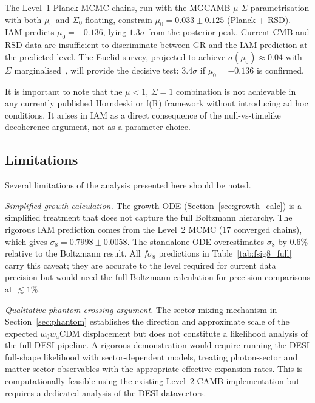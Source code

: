 \documentclass[12pt,a4paper]{article}
\begin{document}
The Level~1 Planck MCMC chains, run with the MGCAMB $\mu$-$\Sigma$
parametrisation with both $\mu_0$ and $\Sigma_0$ floating, constrain
$\mu_0 = 0.033 \pm 0.125$ (Planck + RSD).
IAM predicts $\mu_0 = -0.136$, lying $1.3\sigma$ from the posterior peak.
Current CMB and RSD data are insufficient to discriminate between GR and
the IAM prediction at the predicted level.
The Euclid survey, projected to achieve $\sigma(\mu_0) \approx 0.04$ with
$\Sigma$ marginalised~\citep{Euclid2020forecast}, will provide the
decisive test: $3.4\sigma$ if $\mu_0 = -0.136$ is confirmed.

It is important to note that the $\mu < 1$, $\Sigma = 1$ combination is
not achievable in any currently published Horndeski or f(R) framework
without introducing ad hoc conditions.
It arises in IAM as a direct consequence of the null-vs-timelike
decoherence argument, not as a parameter choice.

\subsection{Limitations}
\label{sec:limits}

Several limitations of the analysis presented here should be noted.

\textit{Simplified growth calculation.}
The growth ODE (Section~\ref{sec:growth_calc}) is a simplified treatment
that does not capture the full Boltzmann hierarchy.
The rigorous IAM prediction comes from the Level~2 MCMC (17 converged
chains), which gives $\sigma_8 = 0.7998 \pm 0.0058$.
The standalone ODE overestimates $\sigma_8$ by $0.6\%$ relative to the
Boltzmann result.
All $f\sigma_8$ predictions in Table~\ref{tab:fsig8_full} carry this
caveat; they are accurate to the level required for current data precision
but would need the full Boltzmann calculation for precision comparisons
at $\lesssim 1\%$.

\textit{Qualitative phantom crossing argument.}
The sector-mixing mechanism in Section~\ref{sec:phantom} establishes
the direction and approximate scale of the expected $w_0 w_a$CDM
displacement but does not constitute a likelihood analysis of the full
DESI pipeline.
A rigorous demonstration would require running the DESI full-shape
likelihood with sector-dependent models, treating photon-sector and
matter-sector observables with the appropriate effective expansion rates.
This is computationally feasible using the existing Level~2 CAMB
implementation but requires a dedicated analysis of the DESI datavectors.
\end{document}
